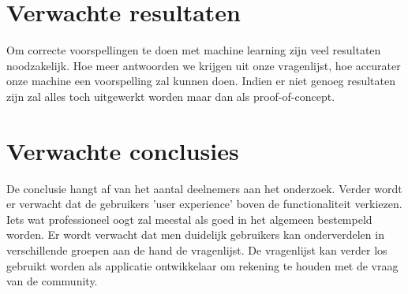 \section{Verwachte resultaten}
\label{sec:verwachte_resultaten}

Om correcte voorspellingen te doen met machine learning zijn veel resultaten noodzakelijk. Hoe meer antwoorden we krijgen uit onze vragenlijst, hoe accurater onze machine een voorspelling zal kunnen doen. Indien er niet genoeg resultaten zijn zal alles toch uitgewerkt worden maar dan als proof-of-concept.

\section{Verwachte conclusies}
\label{sec:verwachte_conclusies}

De conclusie hangt af van het aantal deelnemers aan het onderzoek. Verder wordt er verwacht dat de gebruikers 'user experience' boven de functionaliteit verkiezen. Iets wat professioneel oogt zal meestal als goed in het algemeen bestempeld worden. Er wordt verwacht dat men duidelijk gebruikers kan onderverdelen in verschillende groepen aan de hand de vragenlijst. De vragenlijst kan verder los gebruikt worden als applicatie ontwikkelaar om rekening te houden met de vraag van de community.\hfill \break \break 
